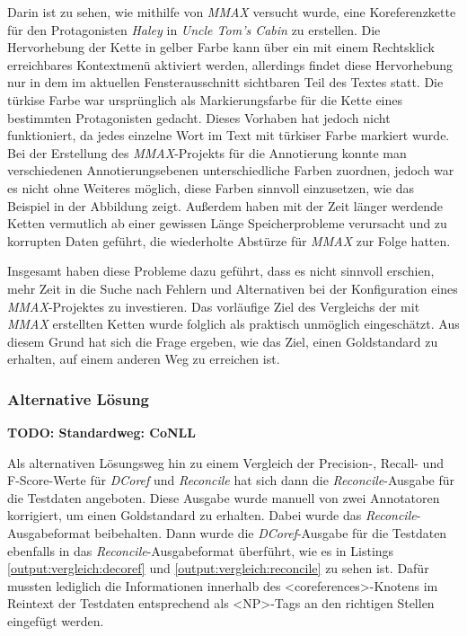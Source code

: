 \documentclass[a4paper,12pt,titlepage=true, ngerman]{scrartcl}
\begin{document}
Darin ist zu sehen, wie mithilfe von \emph{MMAX} versucht wurde, eine Koreferenzkette 
für den Protagonisten \emph{Haley} in \emph{Uncle Tom's Cabin} \autocite[]{chris_uncle} zu erstellen. 
Die Hervorhebung der Kette in gelber Farbe kann über ein mit einem Rechtsklick erreichbares Kontextmenü 
aktiviert werden, allerdings findet diese Hervorhebung nur in dem im aktuellen Fensterausschnitt 
sichtbaren Teil des Textes statt. 
Die türkise Farbe war ursprünglich als Markierungsfarbe für die Kette eines bestimmten Protagonisten gedacht. 
Dieses Vorhaben hat jedoch nicht funktioniert, da jedes einzelne Wort im Text mit türkiser Farbe markiert wurde. 
Bei der Erstellung des \emph{MMAX}-Projekts für die Annotierung konnte man 
verschiedenen Annotierungsebenen unterschiedliche Farben zuordnen, 
jedoch war es nicht ohne Weiteres möglich, diese Farben sinnvoll einzusetzen, 
wie das Beispiel in der Abbildung zeigt. 
Außerdem haben mit der Zeit länger werdende Ketten vermutlich ab einer gewissen Länge Speicherprobleme verursacht 
und zu korrupten Daten geführt, die wiederholte Abstürze für \emph{MMAX} zur Folge hatten. 

Insgesamt haben diese Probleme dazu geführt, dass es nicht sinnvoll erschien, 
mehr Zeit in die Suche nach Fehlern und Alternativen bei der Konfiguration 
eines \emph{MMAX}-Projektes zu investieren. 
Das vorläufige Ziel des Vergleichs der mit \emph{MMAX} erstellten Ketten wurde folglich 
als praktisch unmöglich eingeschätzt. 
Aus diesem Grund hat sich die Frage ergeben, wie das Ziel, einen Goldstandard zu erhalten, 
auf einem anderen Weg zu erreichen ist.



\subsubsection{Alternative Lösung}%

\textbf{TODO: Standardweg: CoNLL}

Als alternativen Lösungsweg hin zu einem Vergleich der Precision-, Recall- und F-Score-Werte für \emph{DCoref} 
und \emph{Reconcile} hat sich dann die \emph{Reconcile}-Ausgabe für die Testdaten angeboten. 
Diese Ausgabe wurde manuell von zwei Annotatoren korrigiert, um einen Goldstandard zu erhalten. 
Dabei wurde das \emph{Reconcile}-Ausgabeformat beibehalten. 
Dann wurde die \emph{DCoref}-Ausgabe für die Testdaten ebenfalls in das \emph{Reconcile}-Ausgabeformat überführt, 
wie es in Listings  \ref{output:vergleich:decoref} und \ref{output:vergleich:reconcile} zu sehen ist. 
Dafür mussten lediglich die Informationen innerhalb des <coreferences>-Knotens im Reintext der Testdaten 
entsprechend als <NP>-Tags an den richtigen Stellen eingefügt werden.
\end{document}
